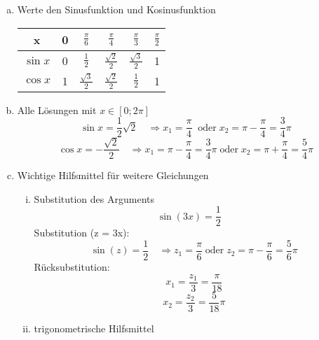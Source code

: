 \documentclass{book}
\begin{document}
    \begin{enumerate}[a)]
        \item Werte den Sinusfunktion und Kosinusfunktion
            \begin{table}[h!]
                \begin{tabular}{c||*{5}{c|}}
                    x & 0 & $\frac {\pi}6$ &$\frac {\pi}4$ &$\frac {\pi}3$ &$\frac {\pi}2$ \\
                    \midrule
                    $\sin x$ & 0 & $\frac 12$ & $\frac{\sqrt{2}}2$ & $\frac{\sqrt{3}}2$ & 1 \\
                    $\cos x$ & 1 & $\frac{\sqrt{3}}2$ & $\frac{\sqrt{2}}2$ & $\frac 12$ & 1 \\

                \end{tabular}
            \end{table}
        \item Alle Lösungen mit $x \in [0;2\pi]$
            \[\sin x = \frac 12 \sqrt 2 \quad \Rightarrow x_1=\frac \pi 4 \: \text{ oder} \; x_2 = \pi - \frac \pi 4 = \frac 34 \pi\]
            \[\cos x = -\frac {\sqrt{2}} 2 \quad \Rightarrow x_1 = \pi - \frac \pi 4 = \frac 34 \pi \; \text{oder}\; x_2 = \pi+\frac \pi 4 = \frac 54 \pi\]
            
        \item Wichtige Hilfsmittel für weitere Gleichungen
            \begin{enumerate}[i)]
                \item Substitution des Arguments
                    \[\sin (3x) = \frac 12 \quad \]
                    Substitution (z = 3x):
                    \[\sin(z) = \frac 12 \quad \Rightarrow z_1 = \frac \pi 6 \; \text{oder} \; z_2 = \pi - \frac \pi 6 = \frac 56 \pi\]
                    Rücksubstitution:
                    \[x_1 = \frac {z_1}3 = \frac \pi {18}\]
                    \[x_2 = \frac {z_2}3 = \frac 5{18}\pi\]
                \item trigonometrische Hilfsmittel \\


\end{enumerate}
\end{enumerate}
\end{document}
